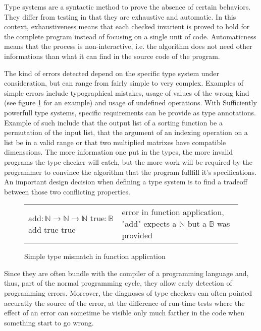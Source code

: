 \documentclass[a4paper, oneside, 12pt, titlepage]{article}
\begin{document}
Type systems are a syntactic method to prove the absence of certain behaviors. They differ from
testing in that they are exhaustive and automatic. In this context, exhaustiveness means that each
checked invarient is proved to hold for the complete program instead of focusing on a single unit of
code. Automaticness means that the process is non-interactive, i.e. the algorithm does not need
other informations than what it can find in the source code of the program.

The kind of errors detected depend on the specific type system under consideration, but can range
from fairly simple to very complex. Examples of simple errors include typographical mistakes, usage
of values of the wrong kind (see figure \ref{fig:simple-type-mismatch} for an example) and usage of
undefined operations. With Sufficiently powerfull type systems, specific requirements can be provide
as type annotations. Example of such include that the output list of a sorting function be a
permutation of the input list, that the argument of an indexing operation on a list be in a valid
range or that two multiplied matrixes have compatible dimenssions. The more information one put in
the types, the more invalid programs the type checker will catch, but the more work will be required
by the programmer to convince the algorithm that the program fullfill it's specifications. An
important design decision when defining a type system is to find a tradeoff between those two
conflicting properties.

\begin{figure}[h]
  \begin{center}
    \begin{tabular}{m{3.5cm} | m{5.5cm}}
      $\text{add} : \mathbb{N} \to \mathbb{N} \to \mathbb{N}$ \newline
      $\text{true} : \mathbb{B}$ \newline
      add true true
      & error in function application, "add" expects a $\mathbb{N}$ but a $\mathbb{B}$ was provided
    \end{tabular}
  \end{center}
  \caption{Simple type mismatch in function application}
  \label{fig:simple-type-mismatch}
\end{figure}

Since they are often bundle with the compiler of a programming language and, thus, part of the
normal programming cycle, they allow early detection of programming errors. Moreover, the diagnoses
of type checkers can often pointed accuratly the source of the error, at the difference of run-time
tests where the effect of an error can sometime be visible only much farther in the code when
something start to go wrong.
\end{document}
